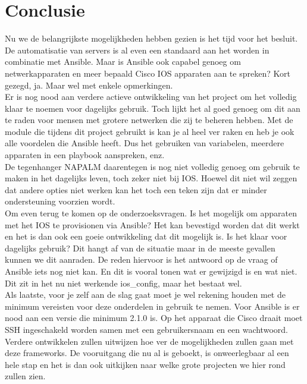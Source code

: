 
\chapter{Conclusie}
\label{ch:conclusie}

Nu we de belangrijkste mogelijkheden hebben gezien is het tijd voor het besluit. De automatisatie van servers is al even een standaard aan het worden in combinatie met Ansible. Maar is Ansible ook capabel genoeg om netwerkapparaten en meer bepaald Cisco IOS apparaten aan te spreken? Kort gezegd, ja. Maar wel met enkele opmerkingen.
\\

Er is nog nood aan verdere actieve ontwikkeling van het project om het volledig klaar te noemen voor dagelijks gebruik. Toch lijkt het al goed genoeg om dit aan te raden voor mensen met grotere netwerken die zij te beheren hebben. Met de module die tijdens dit project gebruikt is kan je al heel ver raken en heb je ook alle voordelen die Ansible heeft. Dus het gebruiken van variabelen, meerdere apparaten in een playbook aanspreken, enz.
\\

De tegenhanger NAPALM daarentegen is nog niet volledig genoeg om gebruik te maken in het dagelijks leven, toch zeker niet bij IOS. Hoewel dit niet wil zeggen dat andere opties niet werken kan het toch een teken zijn dat er minder ondersteuning voorzien wordt.
\\

Om even terug te komen op de onderzoeksvragen. Is het mogelijk om apparaten met het IOS te provisionen via Ansible? Het kan bevestigd worden dat dit werkt en het is dan ook een goeie ontwikkeling dat dit mogelijk is. Is het klaar voor dagelijks gebruik? Dit hangt af van de situatie maar in de meeste gevallen kunnen we dit aanraden. De reden hiervoor is het antwoord op de vraag of Ansible iets nog niet kan. En dit is vooral tonen wat er gewijzigd is en wat niet. Dit zit in het nu niet werkende ios\_config, maar het bestaat wel.
\\

Als laatste, voor je zelf aan de slag gaat moet je wel rekening houden met de minimum vereisten voor deze onderdelen in gebruik te nemen. Voor Ansible is er nood aan een versie die minimum 2.1.0 is. Op het apparaat die Cisco draait moet SSH ingeschakeld worden samen met een gebruikersnaam en een wachtwoord. 
\\

Verdere ontwikkelen zullen uitwijzen hoe ver de mogelijkheden zullen gaan met deze frameworks. De vooruitgang die nu al is geboekt, is onweerlegbaar al een hele stap en het is dan ook uitkijken naar welke grote projecten we hier rond zullen zien.

